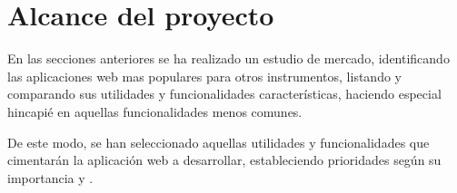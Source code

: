 \section{Alcance del proyecto}
\label{c:alcance}

En las secciones anteriores se ha realizado un estudio de mercado, identificando las aplicaciones web mas populares para otros instrumentos, listando y comparando sus utilidades y funcionalidades características, haciendo especial hincapié en aquellas funcionalidades menos comunes.

De este modo, se han seleccionado aquellas utilidades y funcionalidades que cimentarán la aplicación web a desarrollar, estableciendo prioridades según su importancia  y .

